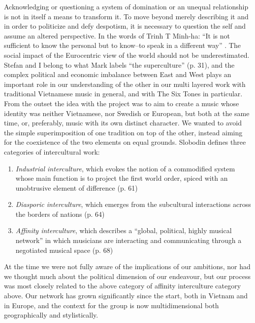 \documentclass[a4paper]{article}
\begin{document}
Acknowledging or questioning a system of domination or an unequal relationship is not in itself a means to transform it. To move beyond merely describing it and in order to politicize and defy despotism, it is necessary to question the self and assume an altered perspective. In the words of Trinh T Minh-ha: ``It is not sufficient to know the personal but to know--to speak in a different way'' \citep[][p. 164]{trinh91}. 
The social impact of the Eurocentric view of the world should not be underestimated. Stefan and I belong to what Mark \citet{slobin1987} labels ``the superculture'' (p. 31), and the complex political and economic imbalance between East and West plays an important role in our understanding of the other in our multi layered work with traditional Vietnamese music in general, and with The Six Tones in particular. From the outset the idea with the project was to aim to create a music whose identity was neither Vietnamese, nor Swedish or European, but both at the same time, or, preferably, music with its own distinct character. We wanted to avoid the simple superimposition of one tradition on top of the other, instead aiming for the coexistence of the two elements on equal grounds. Slobodin defines three categories of intercultural work:

\begin{enumerate}
\item \emph{Industrial interculture}, which evokes the notion of a commodified system whose main function is to project the first world order, spiced with an unobtrusive element of difference (p. 61)
\item \emph{Diasporic interculture}, which emerges from the subcultural interactions across the borders of nations (p. 64)
\item \emph{Affinity interculture}, which describes a ``global, political, highly musical network'' in which musicians are interacting and communicating through a negotiated musical space (p. 68)
\end{enumerate}

At the time we were not fully aware of the implications of our ambitions, nor had we thought much about the political dimension of our endeavour, but our process was most closely related to the above category of affinity interculture category above. Our network has grown significantly since the start, both in Vietnam and in Europe, and the context for the group is now multidimensional both geographically and stylistically. %
\end{document}
